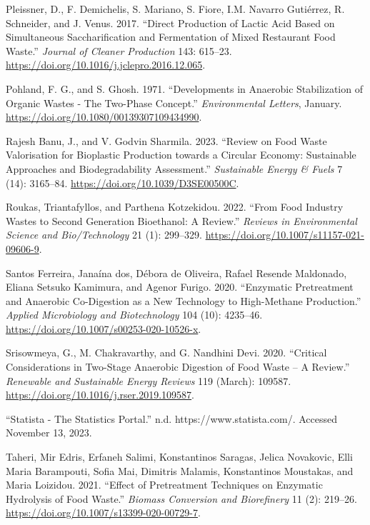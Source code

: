 \documentclass[11pt]{report}
\begin{document}
\begin{hangparas}{1.5em}{1}
\hypertarget{citeproc_bib_item_18}{Pleissner, D., F. Demichelis, S. Mariano, S. Fiore, I.M. Navarro Gutiérrez, R. Schneider, and J. Venus. 2017. “Direct Production of Lactic Acid Based on Simultaneous Saccharification and Fermentation of Mixed Restaurant Food Waste.” \textit{Journal of Cleaner Production} 143: 615–23. \url{https://doi.org/10.1016/j.jclepro.2016.12.065}.}

\hypertarget{citeproc_bib_item_19}{Pohland, F. G., and S. Ghosh. 1971. “Developments in Anaerobic Stabilization of Organic Wastes - The Two-Phase Concept.” \textit{Environmental Letters}, January. \url{https://doi.org/10.1080/00139307109434990}.}

\hypertarget{citeproc_bib_item_20}{Rajesh Banu, J., and V. Godvin Sharmila. 2023. “Review on Food Waste Valorisation for Bioplastic Production towards a Circular Economy: Sustainable Approaches and Biodegradability Assessment.” \textit{Sustainable Energy \& Fuels} 7 (14): 3165–84. \url{https://doi.org/10.1039/D3SE00500C}.}

\hypertarget{citeproc_bib_item_21}{Roukas, Triantafyllos, and Parthena Kotzekidou. 2022. “From Food Industry Wastes to Second Generation Bioethanol: A Review.” \textit{Reviews in Environmental Science and Bio/Technology} 21 (1): 299–329. \url{https://doi.org/10.1007/s11157-021-09606-9}.}

\hypertarget{citeproc_bib_item_22}{Santos Ferreira, Janaína dos, Débora de Oliveira, Rafael Resende Maldonado, Eliana Setsuko Kamimura, and Agenor Furigo. 2020. “Enzymatic Pretreatment and Anaerobic Co-Digestion as a New Technology to High-Methane Production.” \textit{Applied Microbiology and Biotechnology} 104 (10): 4235–46. \url{https://doi.org/10.1007/s00253-020-10526-x}.}

\hypertarget{citeproc_bib_item_23}{Srisowmeya, G., M. Chakravarthy, and G. Nandhini Devi. 2020. “Critical Considerations in Two-Stage Anaerobic Digestion of Food Waste – A Review.” \textit{Renewable and Sustainable Energy Reviews} 119 (March): 109587. \url{https://doi.org/10.1016/j.rser.2019.109587}.}

\hypertarget{citeproc_bib_item_24}{“Statista - The Statistics Portal.” n.d. https://www.statista.com/. Accessed November 13, 2023.}

\hypertarget{citeproc_bib_item_25}{Taheri, Mir Edris, Erfaneh Salimi, Konstantinos Saragas, Jelica Novakovic, Elli Maria Barampouti, Sofia Mai, Dimitris Malamis, Konstantinos Moustakas, and Maria Loizidou. 2021. “Effect of Pretreatment Techniques on Enzymatic Hydrolysis of Food Waste.” \textit{Biomass Conversion and Biorefinery} 11 (2): 219–26. \url{https://doi.org/10.1007/s13399-020-00729-7}.}


\end{hangparas}
\end{document}

